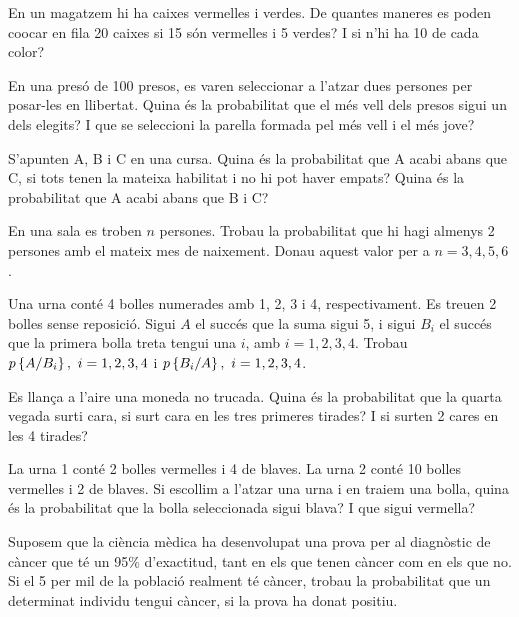 \begin{prob}
{En un magatzem hi ha caixes vermelles i verdes. De
quantes maneres es poden co{\lgem}ocar en fila 20 caixes si 15 s\'on
vermelles i 5 verdes? I si n'hi ha 10 de cada color?}
\end{prob}

\begin{prob}
{En una pres\'o de 100 presos, es varen seleccionar a l'atzar dues
persones per posar-les en llibertat. Quina \'es la probabilitat que el m\'es
vell dels presos sigui un dels elegits? I que se seleccioni la
parella formada pel m\'es vell i el m\'es jove?}
\end{prob}

\begin{prob}
{S'apunten A, B i C en una cursa. Quina \'es la probabilitat 
que A acabi abans que C, si tots tenen la mateixa habilitat i no hi pot haver
empats? Quina \'es la probabilitat que A acabi abans que B i C?}
\end{prob}

\begin{prob}
{En una sala es troben $n$ persones. Trobau la probabilitat que
hi hagi almenys 2 persones amb el mateix mes de naixement. Donau aquest
valor per a $n=3,4,5,6$.}
\end{prob}

\begin{prob}
{Una urna cont\'e 4 bolles numerades amb 1, 2, 3 i 4, respectivament. Es
treuen 2 bolles sense reposici\'o. Sigui $A$ el succ\'es que la suma sigui
5, i sigui $B_i$ el succ\'es que la primera bolla treta tengui una $i$,
amb $i=1,2,3,4$. Trobau $p\left\{A/B_i\right\},\ i=1,2,3,4$ i $p\left\{B_i/A\right\},\
i=1,2,3,4$.}
\end{prob}

\begin{prob}
{Es llan\c{c}a a l'aire una moneda no trucada. Quina \'es la
probabilitat que la quarta vegada surti cara, si surt cara en les tres
primeres tirades? I si surten 2 cares en les 4 tirades?}
\end{prob}

\begin{prob}
{La urna 1 cont\'e 2 bolles vermelles i 4 de blaves. La urna 2 cont\'e 10
bolles vermelles i 2 de blaves. Si escollim a l'atzar una urna i en traiem una
bolla, quina \'es la probabilitat que la bolla seleccionada
sigui blava? I que sigui vermella?}
\end{prob}

\begin{prob}
{Suposem que la ci\`encia m\`edica ha desenvolupat una prova per al
diagn\`ostic de c\`ancer que t\'e un 95\% d'exactitud, tant en els que tenen
c\`ancer com en els que no. Si el 5 per mil de la poblaci\'o realment t\'e
c\`ancer, trobau la probabilitat que un determinat individu tengui
c\`ancer, si la prova ha donat positiu.}
\end{prob}

